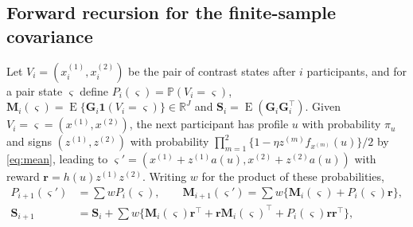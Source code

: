 \documentclass[12pt,a4paper]{article}
\theoremstyle{definition}
\theoremstyle{remark}\newtheorem{remark}{Remark}
\numberwithin{equation}{section}
\newcommand{\E}{\operatorname{E}}
\newcommand{\Pp}{\mathbb P}
\newcommand{\R}{\mathbb R}
\begin{document}
\subsection{Forward recursion for the finite-sample covariance}\label{sec:supp-dp}
Let $V_i=(x^{(1)}_i,x^{(2)}_i)$ be the pair of contrast states after $i$ participants, and for a pair state $\varsigma$ define $P_i(\varsigma)=\Pp(V_i=\varsigma)$, $\bm M_i(\varsigma)=\E\{\bm G_i\mathbf 1(V_i=\varsigma)\}\in\R^J$ and $\bm S_i=\E(\bm G_i\bm G_i^\top)$. Given $V_i=\varsigma=(x^{(1)},x^{(2)})$, the next participant has profile $u$ with probability $\pi_u$ and signs $(z^{(1)},z^{(2)})$ with probability $\prod_{m=1}^2\{1-\eta z^{(m)}f_{x^{(m)}}(u)\}/2$ by \eqref{eq:mean}, leading to $\varsigma'=(x^{(1)}+z^{(1)}a(u),x^{(2)}+z^{(2)}a(u))$ with reward $\bm r=h(u)z^{(1)}z^{(2)}$. Writing $w$ for the product of these probabilities,
\begin{align*}
 P_{i+1}(\varsigma')&=\sum wP_i(\varsigma),\qquad
 \bm M_{i+1}(\varsigma')=\sum w\{\bm M_i(\varsigma)+P_i(\varsigma)\bm r\},\\
 \bm S_{i+1}&=\bm S_i+\sum w\{\bm M_i(\varsigma)\bm r^\top
                 +\bm r\bm M_i(\varsigma)^\top+P_i(\varsigma)\bm r\bm r^\top\},
\end{align*}
\end{document}
